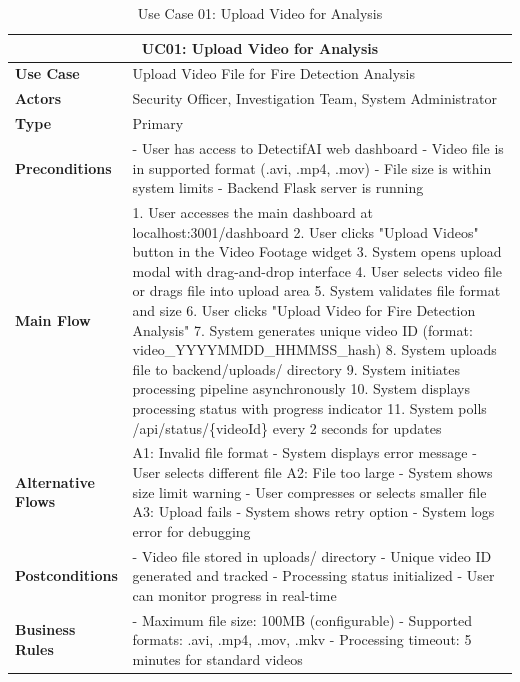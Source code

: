 \documentclass{article}
\begin{document}
\begin{table}[H]
\centering
\begin{tabularx}{\textwidth}{|l|X|}
\hline
\multicolumn{2}{|c|}{\textbf{UC01: Upload Video for Analysis}} \\ \hline
\textbf{Use Case} & Upload Video File for Fire Detection Analysis \\ \hline
\textbf{Actors} & Security Officer, Investigation Team, System Administrator \\ \hline
\textbf{Type} & Primary \\ \hline
\textbf{Preconditions} & 
- User has access to DetectifAI web dashboard
- Video file is in supported format (.avi, .mp4, .mov)
- File size is within system limits
- Backend Flask server is running \\ \hline
\textbf{Main Flow} & 
1. User accesses the main dashboard at localhost:3001/dashboard
2. User clicks "Upload Videos" button in the Video Footage widget
3. System opens upload modal with drag-and-drop interface
4. User selects video file or drags file into upload area
5. System validates file format and size
6. User clicks "Upload Video for Fire Detection Analysis"
7. System generates unique video ID (format: video\_YYYYMMDD\_HHMMSS\_hash)
8. System uploads file to backend/uploads/ directory
9. System initiates processing pipeline asynchronously
10. System displays processing status with progress indicator
11. System polls /api/status/\{videoId\} every 2 seconds for updates \\ \hline
\textbf{Alternative Flows} & 
A1: Invalid file format
- System displays error message
- User selects different file
A2: File too large
- System shows size limit warning
- User compresses or selects smaller file
A3: Upload fails
- System shows retry option
- System logs error for debugging \\ \hline
\textbf{Postconditions} & 
- Video file stored in uploads/ directory
- Unique video ID generated and tracked
- Processing status initialized
- User can monitor progress in real-time \\ \hline
\textbf{Business Rules} & 
- Maximum file size: 100MB (configurable)
- Supported formats: .avi, .mp4, .mov, .mkv
- Processing timeout: 5 minutes for standard videos \\ \hline
\end{tabularx}
\caption{Use Case 01: Upload Video for Analysis}
\end{table}
\end{document}
